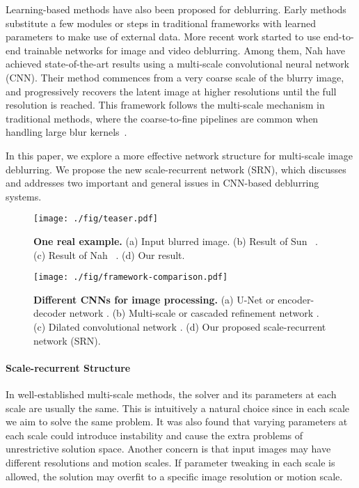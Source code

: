 \documentclass[10pt,twocolumn,letterpaper]{article}
\begin{document}
Learning-based methods have also been proposed for deblurring. Early methods \cite{schuler2016learning,sun2015learning,xiao2016learning} substitute a few modules or steps in traditional frameworks with learned parameters to make use of external data. More recent work started to use end-to-end trainable networks for image \cite{nah2017deep} and video \cite{hyun2017online,su2017deep} deblurring. Among them, Nah \etal \cite{nah2017deep} have achieved state-of-the-art results using a multi-scale convolutional neural network (CNN). Their method commences from a very coarse scale of the blurry image, and progressively recovers the latent image at higher resolutions until the full resolution is reached. This framework follows the multi-scale mechanism in traditional methods, where the coarse-to-fine pipelines are common when handling large blur kernels~\cite{cho2009fast}.



In this paper, we explore a more effective network structure for multi-scale image deblurring. We propose the new scale-recurrent network (SRN), which discusses and addresses two important and general issues in CNN-based deblurring systems.

\begin{figure}[t]
  \begin{center}
\texttt{[image: ./fig/teaser.pdf]}
  \end{center}
  \vspace{-0.1in}
  \caption{\textbf{One real example.} (a) Input blurred image. (b) Result of Sun \etal~\cite{sun2015learning}.
  (c) Result of Nah \etal~\cite{nah2017deep}. (d) Our result.}\label{fig:teaser}
\end{figure}

\begin{figure*}[ht]
    \begin{center}
\texttt{[image: ./fig/framework-comparison.pdf]}
    \end{center}
   \caption{\textbf{Different CNNs for image processing.} (a) U-Net \cite{ronneberger2015u} or encoder-decoder network \cite{mao2016image}. (b) Multi-scale \cite{nah2017deep} or cascaded refinement network \cite{chen2017photographic}. (c) Dilated convolutional network \cite{chen2017fast}. (d) Our proposed scale-recurrent network (SRN).}\label{fig:cnns}
\end{figure*}

\vspace{-0.1in}
\paragraph{Scale-recurrent Structure}
In well-established multi-scale methods, the solver and its parameters at each scale are usually the same. This is intuitively a natural choice since in each scale we aim to solve the same problem. It was also found that varying parameters at each scale could introduce instability and cause the extra problems of unrestrictive solution space. Another concern is that input images may have different resolutions and motion scales. If parameter tweaking in each scale is allowed, the solution may overfit to a specific image resolution or motion scale.
\end{document}

